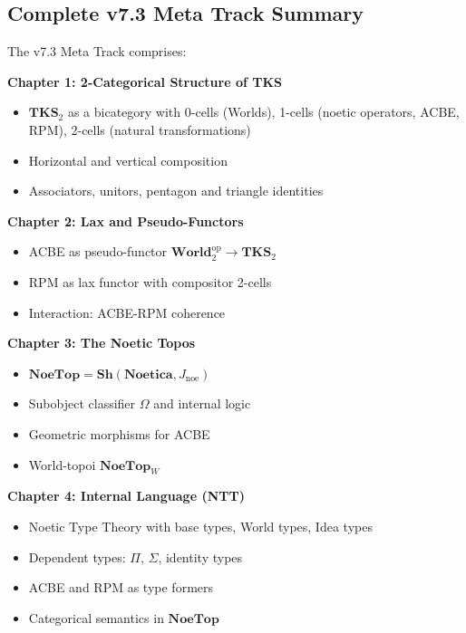 \subsection{Complete v7.3 Meta Track Summary}
\label{subsec:v73-meta-summary}

\begin{remark}
\label{rem:v73-all-chapters}
The v7.3 Meta Track comprises:

\textbf{Chapter 1: 2-Categorical Structure of TKS}
\begin{itemize}
  \item $\mathbf{TKS}_2$ as a bicategory with 0-cells (Worlds), 1-cells (noetic operators,
        ACBE, RPM), 2-cells (natural transformations)
  \item Horizontal and vertical composition
  \item Associators, unitors, pentagon and triangle identities
\end{itemize}

\textbf{Chapter 2: Lax and Pseudo-Functors}
\begin{itemize}
  \item ACBE as pseudo-functor $\mathbf{World}_2^{\mathrm{op}} \to \mathbf{TKS}_2$
  \item RPM as lax functor with compositor 2-cells
  \item Interaction: ACBE-RPM coherence
\end{itemize}

\textbf{Chapter 3: The Noetic Topos}
\begin{itemize}
  \item $\mathbf{NoeTop} = \mathbf{Sh}(\mathbf{Noetica}, J_{\mathrm{noe}})$
  \item Subobject classifier $\Omega$ and internal logic
  \item Geometric morphisms for ACBE
  \item World-topoi $\mathbf{NoeTop}_W$
\end{itemize}

\textbf{Chapter 4: Internal Language (NTT)}
\begin{itemize}
  \item Noetic Type Theory with base types, World types, Idea types
  \item Dependent types: $\Pi$, $\Sigma$, identity types
  \item ACBE and RPM as type formers
  \item Categorical semantics in $\mathbf{NoeTop}$
\end{itemize}


\end{remark}
